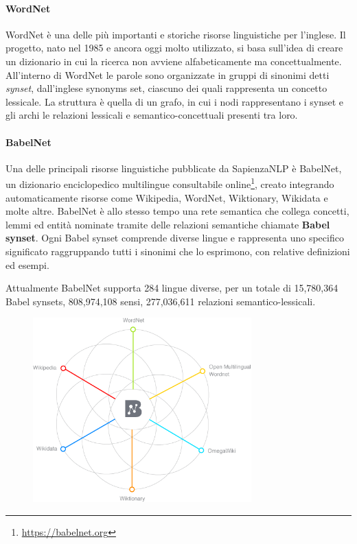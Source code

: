 \paragraph{WordNet \cite{Miller1990}}
WordNet è una delle più importanti e storiche risorse linguistiche per l'inglese.
Il progetto, nato nel 1985 e ancora oggi molto utilizzato, si basa sull'idea
di creare un dizionario in cui la ricerca non avviene alfabeticamente ma concettualmente.
All'interno di WordNet le parole sono organizzate in gruppi di sinonimi detti
\textit{synset}, dall'inglese synonyms set, ciascuno dei quali rappresenta un
concetto lessicale.
La struttura è quella di un grafo, in cui i nodi rappresentano i synset e gli archi
le relazioni lessicali e semantico-concettuali presenti tra loro.

\paragraph{BabelNet \cite{NavigliPonzetto:12aij}}
Una delle principali risorse linguistiche pubblicate da SapienzaNLP è BabelNet,
un dizionario enciclopedico multilingue consultabile online\footnote{\url{https://babelnet.org}},
creato integrando automaticamente risorse come Wikipedia, WordNet, Wiktionary,
Wikidata e molte altre.
BabelNet è allo stesso tempo una rete semantica che collega concetti, lemmi
ed entità nominate tramite delle relazioni semantiche chiamate \textbf{Babel synset}.
Ogni Babel synset comprende diverse lingue e rappresenta uno specifico significato
raggruppando tutti i sinonimi che lo esprimono, con relative definizioni ed esempi.

Attualmente BabelNet supporta 284 lingue diverse, per un totale di 15,780,364
Babel synsets, 808,974,108 sensi, 277,036,611 relazioni semantico-lessicali.

\begin{figure}[ht]
	\centering
	\includegraphics[width=0.75\textwidth]{assets/babelnet.png}
\end{figure}



